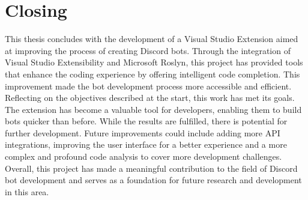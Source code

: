 \section{Closing}
\label{sec:Closing}
This thesis concludes with the development of a Visual Studio Extension aimed at improving the process of creating Discord bots. Through the integration of Visual Studio Extensibility and Microsoft Roslyn, this project has provided tools that enhance the coding experience by offering intelligent code completion. This improvement made the bot development process more accessible and efficient. Reflecting on the objectives described at the start, this work has met its goals. The extension has become a valuable tool for developers, enabling them to build bots quicker than before. While the results are fulfilled, there is potential for further development. Future improvements could include adding more API integrations, improving the user interface for a better experience and a more complex and profound code analysis to cover more development challenges. Overall, this project has made a meaningful contribution to the field of Discord bot development and serves as a foundation for future research and development in this area.